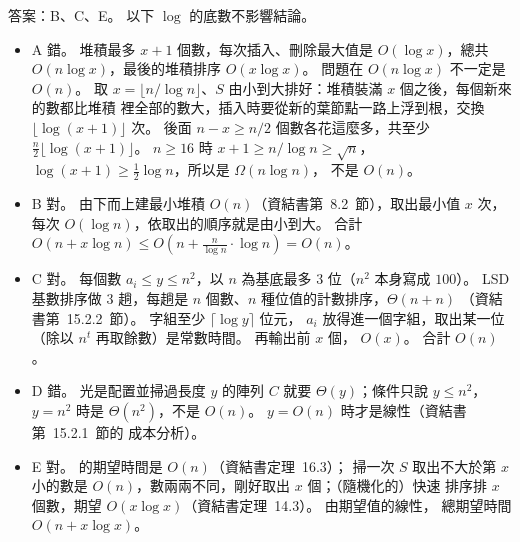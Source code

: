 \begin{pastsoln}
答案：B、C、E。 以下 $\log$ 的底數不影響結論。
\begin{itemize}
\item A 錯。 堆積最多 $x + 1$ 個數，每次插入、刪除最大值是 $O(\log x)$，總共
$O(n \log x)$，最後的堆積排序 $O(x \log x)$。 問題在 $O(n \log x)$ 不一定是 $O(n)$。 取
$x = \lfloor n/\log n \rfloor$、$S$ 由小到大排好：堆積裝滿 $x$ 個之後，每個新來的數都比堆積
裡全部的數大，插入時要從新的葉節點一路上浮到根，交換 $\lfloor \log(x+1) \rfloor$ 次。 後面
$n - x \ge n/2$ 個數各花這麼多，共至少 $\frac{n}{2}\lfloor \log(x+1) \rfloor$。 $n \ge 16$ 時
$x + 1 \ge n/\log n \ge \sqrt{n}$，$\log(x+1) \ge \frac{1}{2}\log n$，所以是 $\Omega(n \log n)$，
不是 $O(n)$。
\item B 對。 由下而上建最小堆積 $O(n)$（資結書第~8.2~節），取出最小值 $x$ 次，
每次 $O(\log n)$，依取出的順序就是由小到大。 合計 $O(n + x \log n) \le
O(n + \frac{n}{\log n} \cdot \log n) = O(n)$。
\item C 對。 每個數 $a_i \le y \le n^2$，以 $n$ 為基底最多 $3$ 位（$n^2$ 本身寫成 $100$）。
LSD 基數排序做 $3$ 趟，每趟是 $n$ 個數、$n$ 種位值的計數排序，$\Theta(n + n)$
（資結書第~15.2.2~節）。 字組至少 $\lceil \log y \rceil$ 位元，
$a_i$ 放得進一個字組，取出某一位（除以 $n^t$ 再取餘數）是常數時間。 再輸出前 $x$ 個，
$O(x)$。 合計 $O(n)$。
\item D 錯。 光是配置並掃過長度 $y$ 的陣列 $C$ 就要 $\Theta(y)$；條件只說 $y \le n^2$，
$y = n^2$ 時是 $\Theta(n^2)$，不是 $O(n)$。 $y = O(n)$ 時才是線性（資結書第~15.2.1~節的
成本分析）。
\item E 對。  的期望時間是 $O(n)$（資結書定理~16.3）；
掃一次 $S$ 取出不大於第 $x$ 小的數是 $O(n)$，數兩兩不同，剛好取出 $x$ 個；（隨機化的）快速
排序排 $x$ 個數，期望 $O(x \log x)$（資結書定理~14.3）。 由期望值的線性，
總期望時間 $O(n + x \log x)$。
\end{itemize}
\end{pastsoln}

